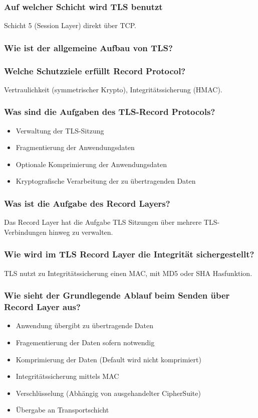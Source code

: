 	\subsubsection{Auf welcher Schicht wird TLS benutzt}
	Schicht 5 (Session Layer) direkt über TCP.
	
	\subsubsection{Wie ist der allgemeine Aufbau von TLS?}

	
	\subsubsection{Welche Schutzziele erfüllt Record Protocol?}
	Vertraulichkeit (symmetrischer Krypto), Integritätssicherung (HMAC).
	
	\subsubsection{Was sind die Aufgaben des TLS-Record Protocols?}
	\begin{itemize}
		\item Verwaltung der TLS-Sitzung
		\item Fragmentierung der Anwendungsdaten
		\item Optionale Komprimierung der Anwendungsdaten
		\item Kryptografische Verarbeitung der zu übertragenden Daten
	\end{itemize}
	
	\subsubsection{Was ist die Aufgabe des Record Layers?}
	Das Record Layer hat die Aufgabe TLS Sitzungen über mehrere TLS-Verbindungen hinweg zu verwalten.
	
	\subsubsection{Wie wird im TLS Record Layer die Integrität sichergestellt?}
	TLS nutzt zu Integritätssicherung einen MAC, mit MD5 oder SHA Hasfunktion. 
	
	\subsubsection{Wie sieht der Grundlegende Ablauf beim Senden über Record Layer aus?}
	\begin{itemize}
		\item Anwendung übergibt zu übertragende Daten
		\item Fragementierung der Daten sofern notwendig
		\item Komprimierung der Daten (Default wird nicht komprimiert)
		\item Integritätssicherung mittels MAC
		\item Verschlüsselung (Abhängig von ausgehandelter CipherSuite)
		\item Übergabe an Transportschicht
	\end{itemize}
